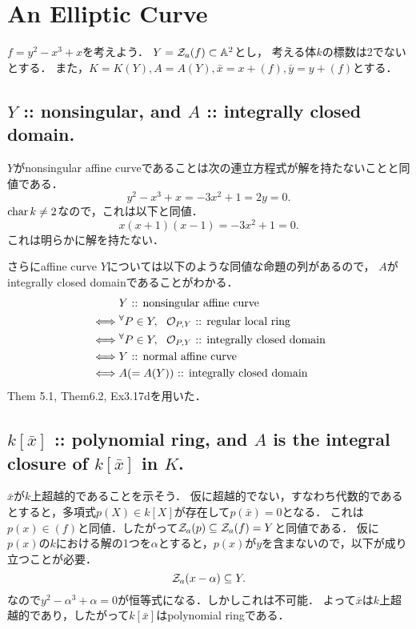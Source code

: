 \documentclass[a4paper]{jsarticle}
\begin{document}
\section{An Elliptic Curve} %
    $f=y^2-x^3+x$を考えよう．
    $Y=\mathcal{Z}_a(f) \subset \mathbb{A}^2$とし，
    考える体$k$の標数は2でないとする．
    また，$K=K(Y), A=A(Y), \bar{x}=x+(f), \bar{y}=y+(f)$とする．

    \subsection{$Y$ :: nonsingular, and $A$ :: integrally closed domain.}
    $Y$がnonsingular affine curveであることは次の連立方程式が解を持たないことと同値である．
    \[ y^2-x^3+x=-3x^2+1=2y=0. \]
    $\operatorname{char} k \neq 2$なので，これは以下と同値．
    \[ x(x+1)(x-1)=-3x^2+1=0. \]
    これは明らかに解を持たない．

    さらにaffine curve $Y$については以下のような同値な命題の列があるので，
    $A$がintegrally closed domainであることがわかる．
    \begin{align*}
        {}&     Y \text{ :: nonsingular affine curve} \\
        \iff&   {}^{\forall} P \in Y,~~ \mathcal{O}_{P,Y} \text{ :: regular local ring} \\
        \iff&   {}^{\forall} P \in Y,~~ \mathcal{O}_{P,Y} \text{ :: integrally closed domain} \\
        \iff&   Y \text{ :: normal affine curve} \\
        \iff&   A (=A(Y)) \text{ :: integrally closed domain}
    \end{align*}
    Them 5.1, Them6.2, Ex3.17dを用いた．
    
    \subsection{$k[\bar{x}]$ :: polynomial ring, and $A$ is the integral closure of $k[\bar{x}]$ in $K$.}
    $\bar{x}$が$k$上超越的であることを示そう．
    仮に超越的でない，すなわち代数的であるとすると，多項式$p(X) \in k[X]$が存在して$p(\bar{x})=0$となる．
    これは$p(x) \in (f)$と同値．したがって$\mathcal{Z}_a(p) \subseteq \mathcal{Z}_a(f)=Y$と同値である．
    仮に$p(x)$の$k$における解の1つを$\alpha$とすると，$p(x)$が$y$を含まないので，以下が成り立つことが必要．
    \[ \mathcal{Z}_a(x-\alpha) \subseteq Y. \]
    なので$y^2-\alpha^3+\alpha=0$が恒等式になる．しかしこれは不可能．
    よって$\bar{x}$は$k$上超越的であり，したがって$k[\bar{x}]$はpolynomial ringである．
\end{document}
